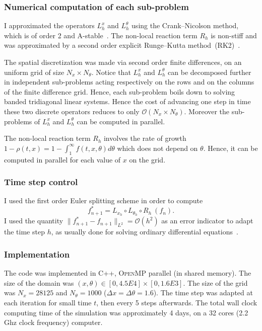 \documentclass[AHL,Unicode,longabstracts]{cedram}
\newcommand{\mO}{\mathcal{O}}
\newcommand{\1}{\mathds{1}}
\begin{document}
\subsubsection{Numerical computation of each sub-problem} 
I approximated the operators $L^x_{h}$ and $L^\theta_{h}$ using the Crank--Nicolson method, which is of order 2 and A-stable~\cite{MR1439506}. The non-local reaction term $R_{h}$ is non-stiff and was approximated by a second order explicit Runge--Kutta method~(RK2)~\cite{hairer1993solving}.

The spatial discretization was made via second order finite differences, on an uniform grid of size $N_x \times N_\theta$. Notice that $L^x_{h}$ and $L^\theta_{h}$ can be decomposed further in independent sub-problems acting respectively on the rows and on the columns of the finite difference grid. Hence, each sub-problem boils down to solving banded tridiagonal linear systems. Hence the cost of advancing one step in time these two discrete operators reduces to only $\mO (N_x \times N_\theta)$. Moreover the sub-problems of $L^x_{h}$ and $L^\theta_{h}$ can be computed in parallel.

The non-local reaction term $R_{h}$ involves the rate of growth $1 - \rho(t,x) = 1- \int_1^\infty f(t,x,\theta) d\theta$ which does not depend on $\theta$. Hence, it can be computed in parallel for each value of $x$ on the grid.

\subsubsection{Time step control}
I used the first order Euler splitting scheme in order to compute
\[
f^*_{n+1}= L_{x_{h}} \circ L_{\theta_h} \circ R_{h}\ (f_{n}).
\]
I used the quantity $\|f^*_{n+1}-f_{n+1}\|_{L^2} = \mO(h^2)$ as an error indicator to adapt the time step $h$, as usually done for solving ordinary differential equations~\cite{hairer1993solving}.

\subsubsection{Implementation}
The code was implemented in \textsc{C++}, \textsc{OpenMP} parallel (in shared memory). The size of the domain was $(x,\theta)\in [0, 4.5E4]\times[0,1.6E3]$. The size of the grid was $N_x = 28125$ and $N_\theta = 1000$ ($\Delta x = \Delta\theta = 1.6$). The time step was adapted at each iteration for small time $t$, then every 5 steps afterwards. The total wall clock computing time of the simulation was approximately 4 days, on a 32 cores (2.2 Ghz clock frequency) computer.
\end{document}
